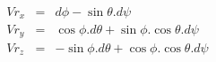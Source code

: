\begin{eqnarray*}
Vr_x & = & d\phi - \sin \theta . d\psi \\
Vr_y & = & \cos \phi .d\theta + \sin \phi .\cos \theta .d\psi \\
Vr_z & = & - \sin \phi .d\theta + \cos \phi .\cos \theta .d\psi \\
\end{eqnarray*}
